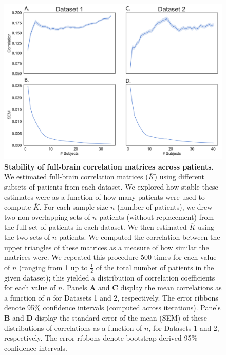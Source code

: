 \documentclass[11pt]{article}
\begin{document}
\begin{figure}[p]
\centering \includegraphics[width=\textwidth]{figs/supplemental_8}
\caption{\textbf{Stability of full-brain correlation matrices across
    patients.}  We estimated full-brain correlation matrices
  ($\overline{K}$) using different subsets of patients from each
  dataset. We explored how stable these estimates were as a function
  of how many patients were used to compute $\overline{K}$. For each sample
  size $n$ (number of patients), we drew two non-overlapping sets of
  $n$ patients (without replacement) from the full set of patients in
  each dataset. We then estimated $\overline{K}$ using the two sets of $n$
  patients.  We computed the correlation between the upper triangles
  of these matrices as a measure of how similar the matrices were.  We
  repeated this procedure 500 times for each value of $n$ (ranging
  from 1 up to $\frac{1}{2}$ of the total number of patients in the
  given dataset); this yielded a distribution of correlation
  coefficients for each value of $n$.  Panels \textbf{A} and
  \textbf{C} display the mean correlations as a function of $n$ for
  Datasets 1 and 2, respectively.  The error ribbons denote 95\%
  confidence intervals (computed across iterations).  Panels
  \textbf{B} and \textbf{D} display the standard error of the mean
  (SEM) of these distributions of correlations as a function of $n$,
  for Datasets 1 and 2, respectively.  The error ribbons denote
  bootstrap-derived 95\% confidence intervals.}
\label{fig:supplemental_8}
\end{figure}

\clearpage
\newpage
\renewcommand{\refname}{Supplemental references}
\renewcommand{\bibnumfmt}[1]{[S#1]}
\renewcommand{\citenumfont}[1]{S#1}



% 
\end{document}
